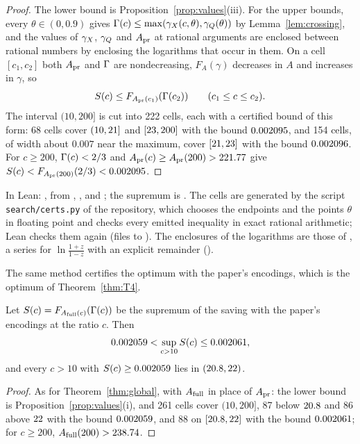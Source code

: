 \begin{proof}
The lower bound is Proposition~\ref{prop:values}(iii).  For the upper bounds,
every \(\theta\in(0,0.9)\) gives \(\Gamma(c)\le\max(\gamma_{X}(c,\theta),\gamma_{Q}(\theta))\)
by Lemma~\ref{lem:crossing}, and the values of \(\gamma_{X}\), \(\gamma_{Q}\) and \(A_{\mathrm{pr}}\) at
rational arguments are enclosed between rational numbers by enclosing the
logarithms that occur in them.  On a cell \([c_1,c_2]\) both \(A_{\mathrm{pr}}\) and
\(\Gamma\) are nondecreasing, \(F_A(\gamma)\) decreases in \(A\) and increases in
\(\gamma\), so
\[
  S(c)\le F_{A_{\mathrm{pr}}(c_1)}(\Gamma(c_2))\qquad(c_1\le c\le c_2).
\]
The interval \((10,200]\) is cut into 222 cells, each with a certified bound of
this form: 68 cells cover \((10,21]\) and \([23,200]\) with the
bound \(0.002095\), and 154 cells, of width about \(0.007\) near the maximum,
cover \([21,23]\) with the bound \(0.002096\).  For \(c\ge200\),
\(\Gamma(c)<2/3\) and \(A_{\mathrm{pr}}(c)\ge A_{\mathrm{pr}}(200)>221.77\) give
\(S(c)<F_{A_{\mathrm{pr}}(200)}(2/3)<0.002095\).
\end{proof}

In Lean: , from ,
,  and
; the supremum is .  The cells are
generated by the script \texttt{search/certs.py} of the repository, which
chooses the endpoints and the points \(\theta\) in floating point and checks
every emitted inequality in exact rational arithmetic; Lean checks them again
(files  to ).  The
enclosures of the logarithms are those of \cite{upstream}, a series for
\(\ln\frac{1+z}{1-z}\) with an explicit remainder ().

The same method certifies the optimum with the paper's encodings, which is the
optimum of Theorem~\ref{thm:T4}.

\begin{theorem}\label{thm:global-full}
Let \(S(c)=F_{A_{\mathrm{full}}(c)}(\Gamma(c))\) be the supremum of the saving with the
paper's encodings at the ratio \(c\).  Then
\[
  0.002059<\sup_{c>10}S(c)\le0.002061,
\]
and every \(c>10\) with \(S(c)\ge0.002059\) lies in \((20.8,22)\).
\end{theorem}

\begin{proof}
As for Theorem~\ref{thm:global}, with \(A_{\mathrm{full}}\) in place of \(A_{\mathrm{pr}}\): the lower
bound is Proposition~\ref{prop:values}(i), and 261 cells cover \((10,200]\),
87 below \(20.8\) and 86 above \(22\) with the bound \(0.002059\), and 88
on \([20.8,22]\) with the bound \(0.002061\); for \(c\ge200\),
\(A_{\mathrm{full}}(200)>238.74\).
\end{proof}

